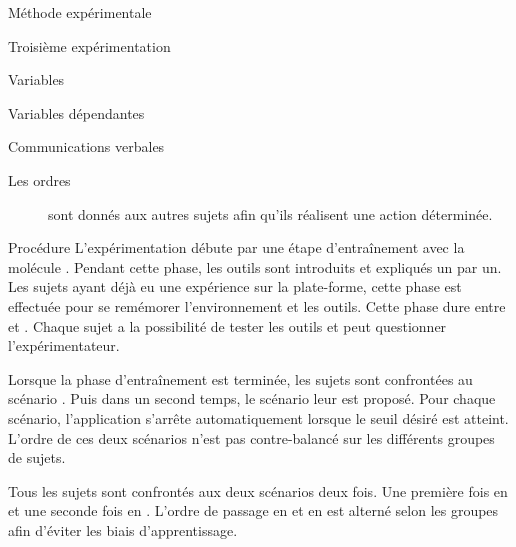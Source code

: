 \documentclass[myfrancais]{mythesis}
\begin{document}
\begin{mychapter}{Méthode expérimentale}
\begin{mysection}{Troisième expérimentation}
\begin{mysubsection}{Variables}
\begin{mysubsubsection}{Variables dépendantes}
\begin{myparagraph}{ Communications verbales}
\begin{description}
							\item[Les ordres] sont donnés aux autres sujets afin qu'ils réalisent une action déterminée.
						\end{description}
					\end{myparagraph}
				\end{mysubsubsection}
			\end{mysubsection}
			\begin{mysubsection}{Procédure}
				L'expérimentation débute par une étape d'entraînement avec la molécule \myTRPCAGE.
				Pendant cette phase, les outils sont introduits et expliqués un par un.
				Les sujets ayant déjà eu une expérience sur la plate-forme, cette phase est effectuée pour se remémorer l'environnement et les outils.
				Cette phase dure entre  et .
				Chaque sujet a la possibilité de tester les outils et peut questionner l'expérimentateur.

				Lorsque la phase d'entraînement est terminée, les sujets sont confrontées au scénario .
				Puis dans un second temps, le scénario  leur est proposé.
				Pour chaque scénario, l'application s'arrête automatiquement lorsque le seuil  désiré est atteint.
				L'ordre de ces deux scénarios n'est pas contre-balancé sur les différents groupes de sujets.

				Tous les sujets sont confrontés aux deux scénarios deux fois.
				Une première fois en  et une seconde fois en .
				L'ordre de passage en  et en  est alterné selon les groupes afin d'éviter les biais d'apprentissage.


\end{mysubsection}
\end{mysection}
\end{mychapter}
\end{document}
